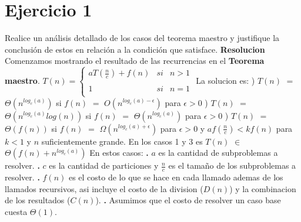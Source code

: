 \documentclass[10pt,a4paper]{article}
\begin{document}
\maketitle

\section{Ejercicio 1}

Realice un análisis detallado de los casos del teorema maestro y justifique la conclusión de estos en relación a la condición que satisface.
\newline
\newline
\textbf{Resolucion}
\newline
\newline
Comenzamos mostrando el resultado de las recurrencias en el \textbf{Teorema maestro}.
\newline
\newline
$T(n) = \left\{ \begin{array}{lcc}
	aT(\displaystyle \frac{n}{c}) + f(n) &   si  & n > 1 \\
	\\          1 &   si  & n = 1     \\
\end{array}
\right.$
\newline
\newline
\newline
La solucion es:
\newline
{}) $T(n)$ $=$ $\Theta(n^{log_{c}(a)})$ si $f(n)$ $=$ $O(n^{log_{c}(a) - \epsilon})$ para $\epsilon > 0$
\newline
{}) $T(n)$ $=$ $\Theta(n^{log_{c}(a)}log(n))$ si $f(n)$ $=$ $\Theta(n^{log_{c}(a)})$ para $\epsilon > 0$
\newline
{}) $T(n)$ $=$ $\Theta(f(n))$ si $f(n)$ $=$ $\Omega(n^{log_{c}(a) + \epsilon})$ para $\epsilon > 0$ y $af(\displaystyle \frac{n}{c}) < kf(n)$ para $k < 1$ y $n$ suficientemente grande. 
\newline
\newline
En los casos 1 y 3 es $T(n)$ $\in$ $\Theta(f(n) + n^{log_{c}(a)})$
\newline
\newline
En estos casos:
\newline
\newline
\textbf{.} $a$ es la cantidad de subproblemas a resolver.
\newline
\newline
\textbf{.} $c$ es la cantidad de particiones y $\displaystyle \frac{n}{c}$ es el tamaño de los subproblemas a resolver. 
\newline
\newline
\textbf{.} $f(n)$ es el costo de lo que se hace en cada llamado ademas de los llamados recursivos, asi incluye el costo de la division ($D(n)$) y la combinacion de los resultados ($C(n)$). 
\newline
\newline
\textbf{.} Asumimos que el costo de resolver un caso base cuesta $\Theta(1)$.
\newpage
\end{document}
